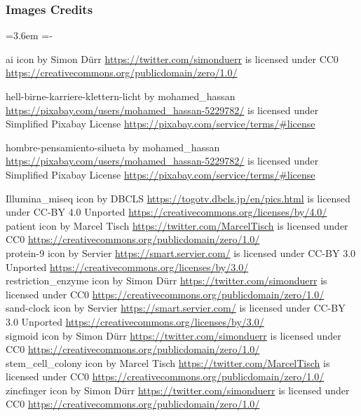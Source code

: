 \documentclass[10pt, british, luatex]{beamer}
\begin{document}
\begin{frame}[allowframebreaks]
	\frametitle{Images Credits}
	{%
		\leftskip=3.6em%
		\parindent=-\leftskip%
		\parskip=0pt%

		\textcolor{primary_inverse_fg}{ai} icon by Simon Dürr \url{https://twitter.com/simonduerr} is licensed under CC0 \url{https://creativecommons.org/publicdomain/zero/1.0/}

		\textcolor{primary_inverse_fg}{hell-birne-karriere-klettern-licht} by mohamed\_hassan \url{https://pixabay.com/users/mohamed_hassan-5229782/} is licensed under Simplified Pixabay License \url{https://pixabay.com/service/terms/\#license}

		\textcolor{primary_inverse_fg}{hombre-pensamiento-silueta} by mohamed\_hassan \url{https://pixabay.com/users/mohamed_hassan-5229782/} is licensed under Simplified Pixabay License \url{https://pixabay.com/service/terms/\#license}

		\textcolor{primary_inverse_fg}{Illumina\_miseq} icon by DBCLS \url{https://togotv.dbcls.jp/en/pics.html} is licensed under CC-BY 4.0 Unported \url{https://creativecommons.org/licenses/by/4.0/}\\[1ex]

		\textcolor{primary_inverse_fg}{patient} icon by Marcel Tisch \url{https://twitter.com/MarcelTisch} is licensed under CC0 \url{https://creativecommons.org/publicdomain/zero/1.0/}\\[1ex]

		\textcolor{primary_inverse_fg}{protein-9} icon by Servier \url{https://smart.servier.com/} is licensed under CC-BY 3.0 Unported \url{https://creativecommons.org/licenses/by/3.0/}\\[1ex]

		\textcolor{primary_inverse_fg}{restriction\_enzyme} icon by Simon Dürr \url{https://twitter.com/simonduerr} is licensed under CC0 \url{https://creativecommons.org/publicdomain/zero/1.0/}\\[1ex]

		\textcolor{primary_inverse_fg}{sand-clock} icon by Servier \url{https://smart.servier.com/} is licensed under CC-BY 3.0 Unported \url{https://creativecommons.org/licenses/by/3.0/}\\[1ex]

		\textcolor{primary_inverse_fg}{sigmoid} icon by Simon Dürr \url{https://twitter.com/simonduerr} is licensed under CC0 \url{https://creativecommons.org/publicdomain/zero/1.0/}\\[1ex]

		\textcolor{primary_inverse_fg}{stem\_cell\_colony} icon by Marcel Tisch \url{https://twitter.com/MarcelTisch} is licensed under CC0 \url{https://creativecommons.org/publicdomain/zero/1.0/}\\[1ex]

		\textcolor{primary_inverse_fg}{zincfinger} icon by Simon Dürr \url{https://twitter.com/simonduerr} is licensed under CC0 \url{https://creativecommons.org/publicdomain/zero/1.0/}\\[1ex]
	}
\end{frame}
\end{document}
